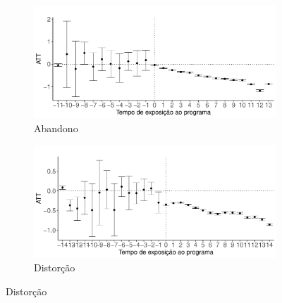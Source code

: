 \begin{figure}[b]
\begin{subfigure}{.5\textwidth}
  \centering
  \includegraphics[width=1\linewidth]{Charts/did_agg_abandono.pdf}  
  \caption{Abandono}
  \label{fig:efeito_abandono}
\end{subfigure}
\begin{subfigure}{.5\textwidth}
  \centering
  \includegraphics[width=1\linewidth]{Charts/did_agg_distorcao.pdf}  
  \caption{Distorção}
  \label{fig:efeito_distorcao}
\end{subfigure}

\label{fig:efeito_agg_indicadores}
\end{figure}